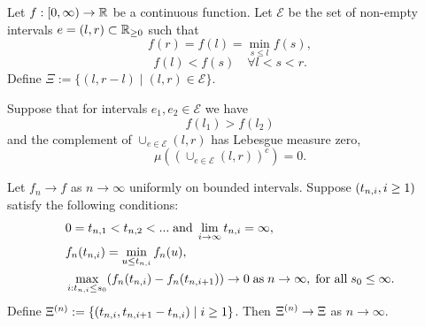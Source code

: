 



\begin{lemma}
Let $f:[0, \infty) \rightarrow \mathbb{R}$ be a continuous function. 
Let $\mathcal{E}$ be the set of non-empty intervals 
$e=(l,r) \subset \mathbb{R}_{\geq 0}$
such that
\begin{equation} \label{E: cond 1}
f(r) = f(l) = \min_{s \leq l} f(s),
\end{equation}
\begin{equation} \label{E: cond 2}
f(l) < f(s) \quad \forall l < s < r.
\end{equation}
Define $\Xi := \lbrace (l, r-l) \; | \; (l, r) \in \mathcal{E} \rbrace$.

Suppose that for intervals $e_1, e_2 \in \mathcal{E}$ we have 
\begin{equation} \label{E: f(l1) > f(l2)}
f(l_1) > f(l_2)
\end{equation}
and the complement of $\cup_{e \in \mathcal{E}} (l,r)$ has Lebesgue measure zero,
\begin{equation} \label{E: complement zero}
\mu \left( \left( \cup_{e \in \mathcal{E}} (l,r) \right)^c\right) = 0.
\end{equation}

Let $f_n \rightarrow f$ as $n \rightarrow \infty$ uniformly on bounded intervals.
Suppose $(t_{n, i}, i \geq 1)$ satisfy the following conditions:
\begin{align}
&0 = t_{n, 1} < t_{n, 2} < ... \; \text{and} \; \lim_{i \rightarrow \infty} t_{n, i} = \infty, \label{E: cond 3} \\ 
&f_n(t_{n, i}) = \min_{u \leq t_{n, i}}f_n(u), \label{E: cond 4} \\ 
&\max_{i: t_{n, i} \leq s_0}(f_n(t_{n, i}) - f_n(t_{n, i+1})) \rightarrow 0 \; \text{as} \; n \rightarrow \infty, \; \text{for all} \; s_0 \leq \infty. \label{E: cond 5}
\end{align}
Define $\Xi^{(n)} := \lbrace (t_{n, i}, t_{n, i+1} - t_{n, i}) \; | \; i \geq 1 \rbrace$.
Then $\Xi^{(n)} \rightarrow \Xi$ as $n \rightarrow \infty$.
\end{lemma}


